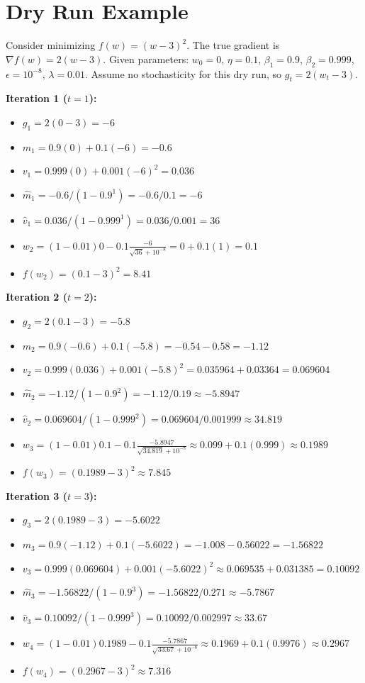 \documentclass{article}
\begin{document}
\section*{Dry Run Example}
Consider minimizing $f(w) = (w-3)^2$. The true gradient is $\nabla f(w) = 2(w-3)$.
Given parameters: $w_0 = 0$, $\eta = 0.1$, $\beta_1 = 0.9$, $\beta_2 = 0.999$, $\epsilon = 10^{-8}$, $\lambda = 0.01$.
Assume no stochasticity for this dry run, so $g_t = 2(w_t-3)$.

\textbf{Iteration 1 ($t=1$):}
\begin{itemize}
    \item $g_1 = 2(0-3) = -6$
    \item $m_1 = 0.9(0) + 0.1(-6) = -0.6$
    \item $v_1 = 0.999(0) + 0.001(-6)^2 = 0.036$
    \item $\hat{m}_1 = -0.6 / (1 - 0.9^1) = -0.6 / 0.1 = -6$
    \item $\hat{v}_1 = 0.036 / (1 - 0.999^1) = 0.036 / 0.001 = 36$
    \item $w_2 = (1 - 0.01)0 - 0.1 \frac{-6}{\sqrt{36} + 10^{-8}} = 0 + 0.1(1) = 0.1$
    \item $f(w_2) = (0.1-3)^2 = 8.41$
\end{itemize}

\textbf{Iteration 2 ($t=2$):}
\begin{itemize}
    \item $g_2 = 2(0.1-3) = -5.8$
    \item $m_2 = 0.9(-0.6) + 0.1(-5.8) = -0.54 - 0.58 = -1.12$
    \item $v_2 = 0.999(0.036) + 0.001(-5.8)^2 = 0.035964 + 0.03364 = 0.069604$
    \item $\hat{m}_2 = -1.12 / (1 - 0.9^2) = -1.12 / 0.19 \approx -5.8947$
    \item $\hat{v}_2 = 0.069604 / (1 - 0.999^2) = 0.069604 / 0.001999 \approx 34.819$
    \item $w_3 = (1 - 0.01)0.1 - 0.1 \frac{-5.8947}{\sqrt{34.819} + 10^{-8}} \approx 0.099 + 0.1(0.999) \approx 0.1989$
    \item $f(w_3) = (0.1989-3)^2 \approx 7.845$
\end{itemize}

\textbf{Iteration 3 ($t=3$):}
\begin{itemize}
    \item $g_3 = 2(0.1989-3) = -5.6022$
    \item $m_3 = 0.9(-1.12) + 0.1(-5.6022) = -1.008 - 0.56022 = -1.56822$
    \item $v_3 = 0.999(0.069604) + 0.001(-5.6022)^2 \approx 0.069535 + 0.031385 = 0.10092$
    \item $\hat{m}_3 = -1.56822 / (1 - 0.9^3) = -1.56822 / 0.271 \approx -5.7867$
    \item $\hat{v}_3 = 0.10092 / (1 - 0.999^3) = 0.10092 / 0.002997 \approx 33.67$
    \item $w_4 = (1 - 0.01)0.1989 - 0.1 \frac{-5.7867}{\sqrt{33.67} + 10^{-8}} \approx 0.1969 + 0.1(0.9976) \approx 0.2967$
    \item $f(w_4) = (0.2967-3)^2 \approx 7.316$
\end{itemize}
\end{document}
